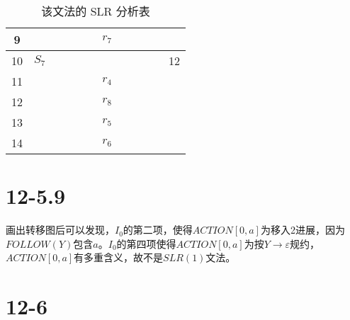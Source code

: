 \documentclass[UTF8]{ctexart}
\begin{document}
\begin{table}[htbp!]
\begin{tabular}{|c|c|c|c|c|c|c|c|c|c|c|c|}
            9     &       &       &       &       &       & $r_7$ &       &       &       &       &       \\
            \hline
            10    & $S_7$ &       &       &       &       &       &       &       &       &       &  12   \\
            \hline
            11    &       &       &       &       &       & $r_4$ &       &       &       &       &       \\
            \hline
            12    &       &       &       &       &       & $r_8$ &       &       &       &       &       \\
            \hline
            13    &       &       &       &       &       & $r_5$ &       &       &       &       &       \\
            \hline
            14    &       &       &       &       &       & $r_6$ &       &       &       &       &       \\
            \hline
            
        \end{tabular}
        \caption{该文法的 SLR 分析表}
        \label{slr1}
    \end{table}

\section*{12-5.9}
    画出转移图后可以发现，$I_0$的第二项，使得$ACTION[0, a]$为移入2进展，因为$FOLLOW(Y)$包含$a$。$I_0$的第四项使得$ACTION[0, a]$为按$Y\to \varepsilon$规约，$ACTION[0, a]$有多重含义，故不是$SLR(1)$文法。

\section*{12-6}
\end{document}

